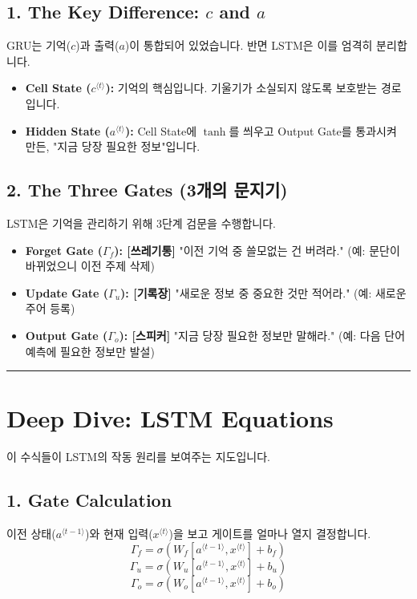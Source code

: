 \documentclass[11pt,a4paper]{book}
\theoremstyle{definition}
\begin{document}
\subsection{1. The Key Difference: $c$ and $a$}
GRU는 기억($c$)과 출력($a$)이 통합되어 있었습니다. 반면 LSTM은 이를 엄격히 분리합니다.


\begin{itemize}
    \item \textbf{Cell State ($c^{\langle t \rangle}$):} 기억의 핵심입니다. 기울기가 소실되지 않도록 보호받는 경로입니다.
    \item \textbf{Hidden State ($a^{\langle t \rangle}$):} Cell State에 $\tanh$를 씌우고 Output Gate를 통과시켜 만든, "지금 당장 필요한 정보"입니다.
\end{itemize}

\subsection{2. The Three Gates (3개의 문지기)}
LSTM은 기억을 관리하기 위해 3단계 검문을 수행합니다.

\begin{analogybox}[title={LSTM의 기억 관리 시스템}]
\begin{itemize}
    \item \textbf{Forget Gate ($\Gamma_f$): [쓰레기통]} "이전 기억 중 쓸모없는 건 버려라." (예: 문단이 바뀌었으니 이전 주제 삭제)
    \item \textbf{Update Gate ($\Gamma_u$): [기록장]} "새로운 정보 중 중요한 것만 적어라." (예: 새로운 주어 등록)
    \item \textbf{Output Gate ($\Gamma_o$): [스피커]} "지금 당장 필요한 정보만 말해라." (예: 다음 단어 예측에 필요한 정보만 발설)
\end{itemize}
\end{analogybox}

\vspace{0.5cm}\hrule\vspace{0.5cm}

\section{Deep Dive: LSTM Equations}

이 수식들이 LSTM의 작동 원리를 보여주는 지도입니다.


\subsection{1. Gate Calculation}
이전 상태($a^{\langle t-1 \rangle}$)와 현재 입력($x^{\langle t \rangle}$)을 보고 게이트를 얼마나 열지 결정합니다.
$$ \Gamma_f = \sigma(W_f[a^{\langle t-1 \rangle}, x^{\langle t \rangle}] + b_f) $$
$$ \Gamma_u = \sigma(W_u[a^{\langle t-1 \rangle}, x^{\langle t \rangle}] + b_u) $$
$$ \Gamma_o = \sigma(W_o[a^{\langle t-1 \rangle}, x^{\langle t \rangle}] + b_o) $$
\end{document}
